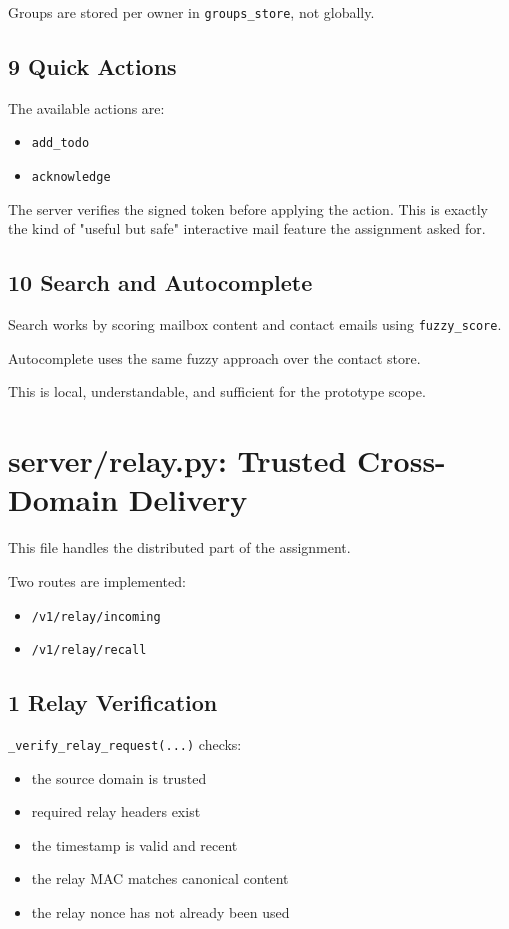 \documentclass[11pt,a4paper]{article}
\begin{document}
Groups are stored per owner in \nolinkurl{groups_store}, not globally.

\subsection{9 Quick Actions}

The available actions are:

\begin{itemize}
\item \nolinkurl{add_todo}
\item \nolinkurl{acknowledge}
\end{itemize}

The server verifies the signed token before applying the action. This is exactly the kind of "useful but safe" interactive mail feature the assignment asked for.

\subsection{10 Search and Autocomplete}

Search works by scoring mailbox content and contact emails using \nolinkurl{fuzzy_score}.

Autocomplete uses the same fuzzy approach over the contact store.

This is local, understandable, and sufficient for the prototype scope.


\section{server/relay.py: Trusted Cross-Domain Delivery}

This file handles the distributed part of the assignment.

Two routes are implemented:

\begin{itemize}
\item \nolinkurl{/v1/relay/incoming}
\item \nolinkurl{/v1/relay/recall}
\end{itemize}

\subsection{1 Relay Verification}

\nolinkurl{_verify_relay_request(...)} checks:

\begin{itemize}
\item the source domain is trusted
\item required relay headers exist
\item the timestamp is valid and recent
\item the relay MAC matches canonical content
\item the relay nonce has not already been used
\end{itemize}
\end{document}
